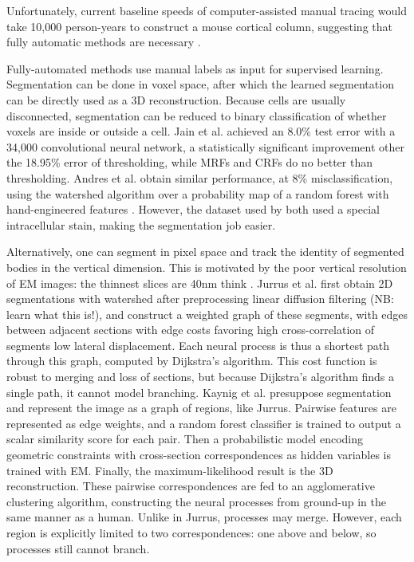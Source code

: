 \documentclass{article}
\begin{document}
Unfortunately, current baseline speeds of computer-assisted manual tracing would take 10,000 person-years to construct a mouse cortical column, suggesting that fully automatic methods are necessary \cite{Briggman2006}.

Fully-automated methods use manual labels as input for supervised learning. Segmentation can be done in voxel space, after which the learned segmentation can be directly used as a 3D reconstruction. Because cells are usually disconnected, segmentation can be reduced to binary classification of whether voxels are inside or outside a cell. Jain et al. \cite{Jain2007} achieved an 8.0\% test error with a 34,000 convolutional neural network, a statistically significant improvement other the 18.95\% error of thresholding, while MRFs and CRFs do no better than thresholding. Andres et al. obtain similar performance, at 8\% misclassification, using the watershed algorithm over a probability map of a random forest with hand-engineered features \cite{Andres2008, Gonzales2008}. However, the dataset used by both used a special intracellular stain, making the segmentation job easier.

Alternatively, one can segment in pixel space and track the identity of segmented bodies in the vertical dimension. This is motivated by the poor vertical resolution of EM images: the thinnest slices are 40nm think \cite{Kaynig2010b, Briggman2006}. Jurrus et al. \cite{Jurrus2008} first obtain 2D segmentations with watershed after preprocessing linear diffusion filtering (NB: learn what this is!), and construct a weighted graph of these segments, with edges between adjacent sections with edge costs favoring high cross-correlation of segments low lateral displacement. Each neural process is thus a shortest path through this graph, computed by Dijkstra's algorithm. This cost function is robust to merging and loss of sections, but because Dijkstra's algorithm finds a single path, it cannot model branching. Kaynig et al. \cite{Kaynig2010a} presuppose segmentation and represent the image as a graph of regions, like Jurrus. Pairwise features are represented as edge weights, and a random forest classifier is trained to output a scalar similarity score for each pair. Then a probabilistic model encoding geometric constraints with cross-section correspondences as hidden variables is trained with EM. Finally, the maximum-likelihood result is the 3D reconstruction. These pairwise correspondences are fed to an agglomerative clustering algorithm, constructing the neural processes from ground-up in the same manner as a human. Unlike in Jurrus, processes may merge. However, each region is explicitly limited to two correspondences: one above and below, so processes still cannot branch.
\end{document}
